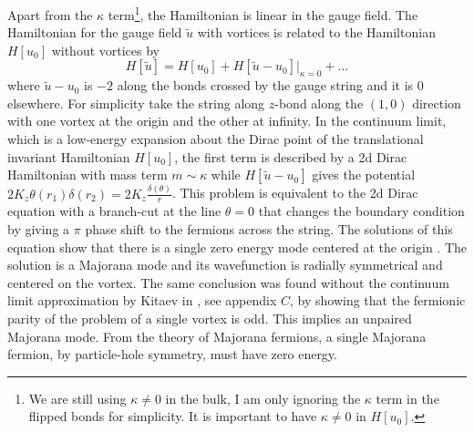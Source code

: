 Apart from the $\kappa$ term\footnote{We are still using $\kappa\neq0$ in the bulk, I am only ignoring the $\kappa$ term in the flipped bonds for simplicity. It is important to have $\kappa\neq0$ in $H[u_0]$.}, the Hamiltonian is linear in the gauge field. The Hamiltonian for the gauge field $\tilde{u}$ with vortices is related to the Hamiltonian $H[u_0]$ without vortices by
\begin{equation}
    H[\tilde{u}] = H[u_0] + H[\tilde{u}-u_0]\Big|_{\kappa=0} + ...
\end{equation}
where $\tilde{u}-u_0$ is $-2$ along the bonds crossed by the gauge string and it is $0$ elsewhere.
For simplicity take the string along $z$-bond along the $(1,0)$ direction with one vortex at the origin and the other at infinity.
In the continuum limit, which is a low-energy expansion about the Dirac point of the translational invariant Hamiltonian $H[u_0]$,  the first term is described by a 2d Dirac Hamiltonian with mass term $m\sim \kappa$ while $H[\tilde{u}-u_0]$ gives the potential $2 K_z \theta(r_1)\delta(r_2)= 2K_z \frac{\delta(\theta)}{r}$. This problem is equivalent to the 2d Dirac equation with a branch-cut at the line $\theta=0$ that changes the boundary condition by giving a $\pi$ phase shift to the fermions across the string. The solutions of this equation show that there is a single zero energy mode centered at the origin \cite{Sachdev_2023}.
The solution is a Majorana mode and its wavefunction is radially symmetrical and centered on the vortex.
The same conclusion was found without the continuum limit approximation by Kitaev in \cite{Kitaev2006}, see appendix $C$, by showing that the fermionic parity of the problem of a single vortex is odd. This implies an unpaired Majorana mode. From the theory of Majorana fermions, a single Majorana fermion, by particle-hole symmetry, must have zero energy.





